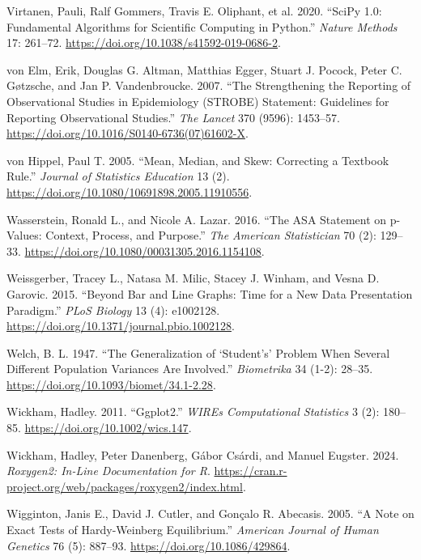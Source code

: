 \documentclass[
]{book}
\newlength{\cslhangindent}
\newenvironment{CSLReferences}[2] %
 {\begin{list}{}{%
  \setlength{\itemindent}{0pt}
  \setlength{\leftmargin}{0pt}
  \setlength{\parsep}{0pt}
  \ifodd #1
   \setlength{\leftmargin}{\cslhangindent}
   \setlength{\itemindent}{-1\cslhangindent}
  \fi
  \setlength{\itemsep}{#2\baselineskip}}}
 {\end{list}}
\begin{document}
\begin{CSLReferences}{1}{1}
{Virtanen, Pauli, Ralf Gommers, Travis E. Oliphant, et al.} 2020. {``{SciPy} 1.0: Fundamental Algorithms for Scientific Computing in {Python}.''} \emph{Nature Methods} 17: 261--72. \url{https://doi.org/10.1038/s41592-019-0686-2}.

{von Elm, Erik, Douglas G. Altman, Matthias Egger, Stuart J. Pocock, Peter C. Gøtzsche, and Jan P. Vandenbroucke}. 2007. {``The Strengthening the Reporting of Observational Studies in Epidemiology ({STROBE}) Statement: Guidelines for Reporting Observational Studies.''} \emph{The Lancet} 370 (9596): 1453--57. \url{https://doi.org/10.1016/S0140-6736(07)61602-X}.

{von Hippel, Paul T.} 2005. {``Mean, Median, and Skew: Correcting a Textbook Rule.''} \emph{Journal of Statistics Education} 13 (2). \url{https://doi.org/10.1080/10691898.2005.11910556}.

Wasserstein, Ronald L., and Nicole A. Lazar. 2016. {``The {ASA} Statement on p-Values: Context, Process, and Purpose.''} \emph{The American Statistician} 70 (2): 129--33. \url{https://doi.org/10.1080/00031305.2016.1154108}.

Weissgerber, Tracey L., Natasa M. Milic, Stacey J. Winham, and Vesna D. Garovic. 2015. {``Beyond Bar and Line Graphs: Time for a New Data Presentation Paradigm.''} \emph{PLoS Biology} 13 (4): e1002128. \url{https://doi.org/10.1371/journal.pbio.1002128}.

Welch, B. L. 1947. {``The Generalization of {`{Student's}'} Problem When Several Different Population Variances Are Involved.''} \emph{Biometrika} 34 (1-2): 28--35. \url{https://doi.org/10.1093/biomet/34.1-2.28}.

Wickham, Hadley. 2011. {``Ggplot2.''} \emph{WIREs Computational Statistics} 3 (2): 180--85. \url{https://doi.org/10.1002/wics.147}.

Wickham, Hadley, Peter Danenberg, Gábor Csárdi, and Manuel Eugster. 2024. \emph{Roxygen2: In-Line Documentation for {R}}. \url{https://cran.r-project.org/web/packages/roxygen2/index.html}.

Wigginton, Janis E., David J. Cutler, and Gonçalo R. Abecasis. 2005. {``A Note on Exact Tests of {Hardy-Weinberg} Equilibrium.''} \emph{American Journal of Human Genetics} 76 (5): 887--93. \url{https://doi.org/10.1086/429864}.


\end{CSLReferences}
\end{document}
